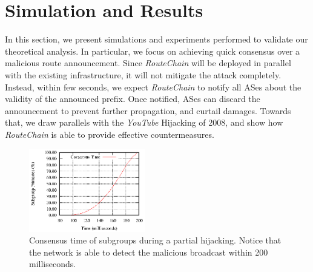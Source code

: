 \documentclass[conference]{IEEEtran}
\newcommand{\rc}{{{\em RouteChain}}\xspace}
\begin{document}

\section{Simulation and Results}\label{sec:simulation}
In this section, we present simulations and experiments performed to validate our theoretical analysis. In particular, we focus on achieving quick consensus over a malicious route announcement. Since \rc will be deployed in parallel with the existing infrastructure, it will not mitigate the attack completely. Instead, within few seconds, we expect \rc to notify all ASes about the validity of the announced prefix. Once notified, ASes can discard the announcement to prevent further propagation, and curtail damages. Towards that, we draw parallels with the {\em YouTube} Hijacking of 2008, and show how \rc is able to provide effective countermeasures.  

\begin{figure}[t]
\begin{center}
\includegraphics[width=0.45\textwidth]{fig/partialHijackR2.eps}
\caption{Consensus time of subgroups during a partial hijacking. Notice that the network is able to detect the malicious broadcast within 200 milliseconds. } 
\label{fig:simPartial}
\end{center}
\end{figure}
\end{document}
